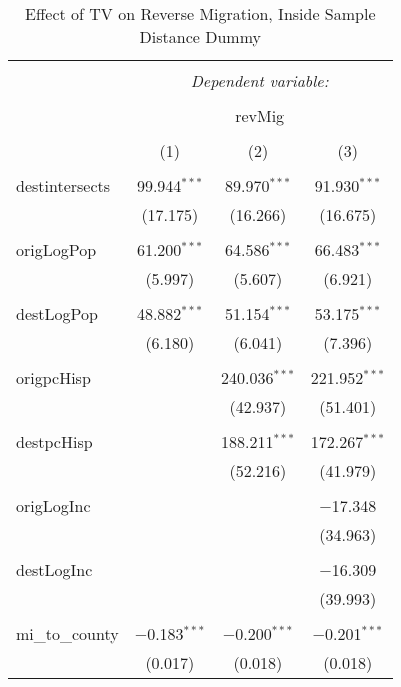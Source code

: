 
\begin{table}[!htbp] \centering 
  \caption{Effect of TV on Reverse Migration, Inside Sample Distance Dummy} 
  \label{} 
\begin{tabular}{@{\extracolsep{5pt}}lccc} 
\\[-1.8ex]\hline 
\hline \\[-1.8ex] 
 & \multicolumn{3}{c}{\textit{Dependent variable:}} \\ 
\cline{2-4} 
\\[-1.8ex] & \multicolumn{3}{c}{revMig} \\ 
\\[-1.8ex] & (1) & (2) & (3)\\ 
\hline \\[-1.8ex] 
 destintersects & 99.944$^{***}$ & 89.970$^{***}$ & 91.930$^{***}$ \\ 
  & (17.175) & (16.266) & (16.675) \\ 
  & & & \\ 
 origLogPop & 61.200$^{***}$ & 64.586$^{***}$ & 66.483$^{***}$ \\ 
  & (5.997) & (5.607) & (6.921) \\ 
  & & & \\ 
 destLogPop & 48.882$^{***}$ & 51.154$^{***}$ & 53.175$^{***}$ \\ 
  & (6.180) & (6.041) & (7.396) \\ 
  & & & \\ 
 origpcHisp &  & 240.036$^{***}$ & 221.952$^{***}$ \\ 
  &  & (42.937) & (51.401) \\ 
  & & & \\ 
 destpcHisp &  & 188.211$^{***}$ & 172.267$^{***}$ \\ 
  &  & (52.216) & (41.979) \\ 
  & & & \\ 
 origLogInc &  &  & $-$17.348 \\ 
  &  &  & (34.963) \\ 
  & & & \\ 
 destLogInc &  &  & $-$16.309 \\ 
  &  &  & (39.993) \\ 
  & & & \\ 
 mi\_to\_county & $-$0.183$^{***}$ & $-$0.200$^{***}$ & $-$0.201$^{***}$ \\ 
  & (0.017) & (0.018) & (0.018) \\ 

\end{tabular}
\end{table}
